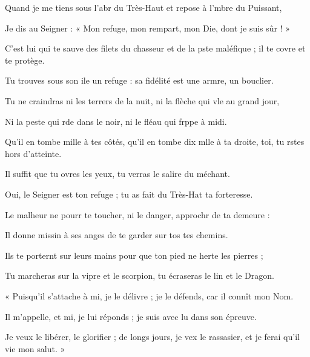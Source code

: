 \item Quand je me tiens sous l’abr du Très-Haut\psstar{} et repose à l’mbre du Puissant,
\item Je dis au Seigner : « Mon refuge,\psstar{} mon rempart, mon Die, dont je suis sûr ! »
\item C’est lui qui te sauve des filets du chasseur et de la pste maléfique ;\psstar{} il te covre et te protège.
\item Tu trouves sous son ile un refuge :\psstar{} sa fidélité est une armre, un bouclier.
\item Tu ne craindras ni les terrers de la nuit,\psstar{} ni la flèche qui vle au grand jour,
\item Ni la peste qui rde dans le noir,\psstar{} ni le fléau qui frppe à midi.
\item Qu’il en tombe mille à tes côtés,\pscross{} qu’il en tombe dix mlle à ta droite,\psstar{} toi, tu rstes hors d’atteinte.
\item Il suffit que tu ovres les yeux,\psstar{} tu verras le salire du méchant.
\item Oui, le Seigner est ton refuge ;\psstar{} tu as fait du Très-Hat ta forteresse.
\item Le malheur ne pourr te toucher,\psstar{} ni le danger, approchr de ta demeure :
\item Il donne missin à ses anges\psstar{} de te garder sur tos tes chemins.
\item Ils te porternt sur leurs mains\psstar{} pour que ton pied ne herte les pierres ;
\item Tu marcheras sur la vipre et le scorpion,\psstar{} tu écraseras le lin et le Dragon.
\item « Puisqu’il s’attache à mi, je le délivre ;\psstar{} je le défends, car il connît mon Nom.
\item Il m’appelle, et mi, je lui réponds ;\psstar{} je suis avec lu dans son épreuve.
\item Je veux le libérer, le glorifier ;\pscross{} de longs jours, je vex le rassasier,\psstar{} et je ferai qu’il vie mon salut. »